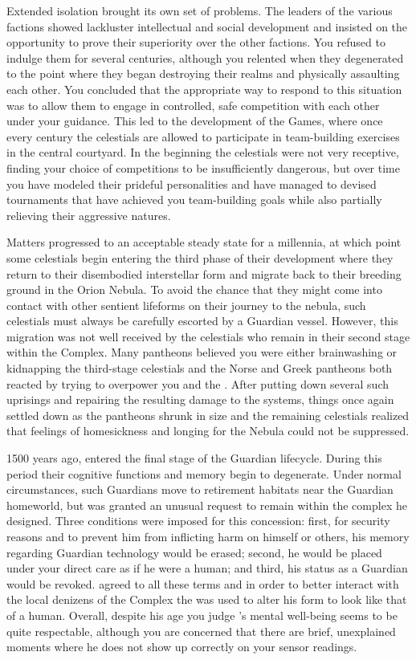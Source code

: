 \documentclass[char]{guardians}
\begin{document}
Extended isolation brought its own set of problems. The leaders of the various factions showed lackluster intellectual and social development and insisted on the opportunity to prove their superiority over the other factions. You refused to indulge them for several centuries, although you relented when they degenerated to the point where they began destroying their realms and physically assaulting each other. You concluded that the appropriate way to respond to this situation was to allow them to engage in controlled, safe competition with each other under your guidance. This led to the development of the Games, where once every century the celestials are allowed to participate in team-building exercises in the central courtyard. In the beginning the celestials were not very receptive, finding your choice of competitions to be insufficiently dangerous, but over time you have modeled their prideful personalities and have managed to devised tournaments that have achieved you team-building goals while also partially relieving their aggressive natures.

Matters progressed to an acceptable steady state for a millennia, at which point some celestials begin entering the third phase of their development where they return to their disembodied interstellar form and migrate back to their breeding ground in the Orion Nebula. To avoid the chance that they might come into contact with other sentient lifeforms on their journey to the nebula, such celestials must always be carefully escorted by a Guardian vessel. However, this migration was not well received by the celestials who remain in their second stage within the Complex. Many pantheons believed you were either brainwashing or kidnapping the third-stage celestials and the Norse and Greek pantheons both reacted by trying to overpower you and the \cWarden{}. After putting down several such uprisings and repairing the resulting damage to the systems, things once again settled down as the pantheons shrunk in size and the remaining celestials realized that feelings of homesickness and longing for the Nebula could not be suppressed.

1500 years ago, \cJascha{} entered the final stage of the Guardian lifecycle. During this period their cognitive functions and memory begin to degenerate. Under normal circumstances, such Guardians move to retirement habitats near the Guardian homeworld, but \cJascha{} was granted an unusual request to remain within the complex he designed. Three conditions were imposed for this concession: first, for security reasons and to prevent him from inflicting harm on himself or others, his memory regarding Guardian technology would be erased; second, he would be placed under your direct care as if he were a human; and third, his status as a Guardian would be revoked. \cJascha{} agreed to all these terms and in order to better interact with the local denizens of the Complex the \assembler{} was used to alter his form to look like that of a human. Overall, despite his age you judge \cJascha{}'s mental well-being seems to be quite respectable, although you are concerned that there are brief, unexplained moments where he does not show up correctly on your sensor readings.
\end{document}

